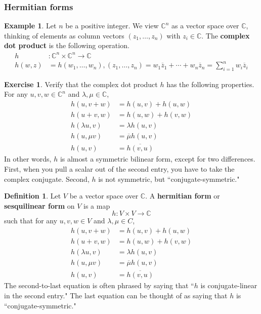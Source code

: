 \documentclass[12pt]{article}
\theoremstyle{definition}
\newtheorem{definition}[theorem]{Definition}
\newtheorem{example}[theorem]{Example}
\newtheorem{exercise}[theorem]{Exercise}
\numberwithin{theorem}{subsection}
\newcommand{\C}{\mathbb{C}}
\newcommand{\lam}{\lambda}
\newcommand{\tbf}{\textbf}
\newcommand{\ov}{\overline}
\begin{document}
\subsubsection{Hermitian forms}

\begin{example}
Let $n$ be a positive integer. We view $\C^n$ as a vector space over $\C$, thinking of elements as column vectors $(z_1, \ldots, z_n)$ with $z_i \in \C$. The \tbf{complex dot product} is the following operation.
\begin{align*}
	h&:\C^n \times \C^n \to \C  \\
	h(w, z) &=  h(w_1, \ldots, w_n),  (z_1, \ldots, z_n) = w_1 \ov z_1 + \cdots + w_n \ov z_n = \sum_{i=1}^n w_i \ov z_i
\end{align*}
\end{example}

\begin{exercise}
Verify that the complex dot product $h$ has the following properties. For any $u,v,w \in \C^n$ and $\lam, \mu \in \C$,
\begin{align*}
	h(u, v+w) &= h(u, v) + h(u,w) \\
	h(u+v, w) &= h(u,w) + h(v,w) \\
	h( \lam u, v) &= \lam h(u,v) \\
	h( u, \mu v) &= \ov \mu h(u,v) \\
	h(u,v) &= \ov{h(v,u)}
\end{align*}
In other words, $h$ is almost a symmetric bilinear form, except for two differences. First, when you pull a scalar out of the second entry, you have to take the complex conjugate. Second, $h$ is not symmetric, but ``conjugate-symmetric."
\end{exercise}

\begin{definition}
Let $V$ be a vector space over $\C$. A \tbf{hermitian form} or \tbf{sesquilinear form} on $V$ is a map
\[
	h:V \times V \to \C
\]
such that for any $u,v,w \in V$ and $\lam, \mu \in C$, 
\begin{align*}
	h(u, v+w) &= h(u, v) + h(u,w) \\
	h(u+v, w) &= h(u,w) + h(v,w) \\
	h( \lam u, v) &= \lam h(u,v) \\
	h( u, \mu v) &= \ov \mu h(u,v) \\
	h(u,v) &= \ov{h(v,u)}
\end{align*}
The second-to-last equation is often phrased by saying that ``$h$ is conjugate-linear in the second entry." The last equation can be thought of as saying that $h$ is ``conjugate-symmetric."
\end{definition}
\end{document}
